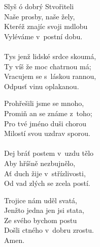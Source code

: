 \begin{translatioMulticol}{3}
Slyš ó dobrý Stvořiteli\\
Naše prosby, naše žely,\\
Kteréž znajíc svoji mdlobu\\
Vyléváme v~postní dobu.\\
\\
Tys jenž lidské srdce skoumá,\\
Ty víš že moc chatrnou má; \\
Vracujem se s~láskou rannou, \\
Odpusť vinu oplakanou.\columnbreak

Prohřešili jsme se mnoho,\\
Promiň an se známe z~toho;\\
Pro tvé jméno duši chorou\\
Milostí svou uzdrav sporou.\\
\\
Dej bráť postem v~uzdu tělo\\
Aby hříšně nezbujnělo,\\
Ať duch žije v~střízlivosti,\\
Od vad zlých se zcela postí.\columnbreak

Trojice nám uděl svatá,\\
Jenžto jedna jen jsi stata,\\
Ze svého bychom postu\\
Došli ctného v~dobru zrostu.\\
Amen.
\end{translatioMulticol}
